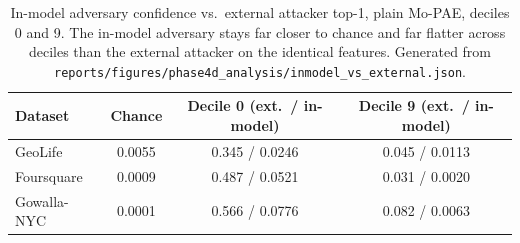 \begin{table}[t]
\centering
\caption{In-model adversary confidence vs.\ external attacker top-1, plain Mo-PAE, deciles 0 and 9. The in-model adversary stays far closer to chance and far flatter across deciles than the external attacker on the identical features. Generated from \texttt{reports/figures/phase4d\_analysis/inmodel\_vs\_external.json}.}
\label{tab:inmodel-vs-external}
\small
\begin{tabular}{@{}lccc@{}}
\toprule
Dataset & Chance & Decile 0 (ext.\ / in-model) & Decile 9 (ext.\ / in-model) \\
\midrule
GeoLife & 0.0055 & 0.345 / 0.0246 & 0.045 / 0.0113 \\
Foursquare & 0.0009 & 0.487 / 0.0521 & 0.031 / 0.0020 \\
Gowalla-NYC & 0.0001 & 0.566 / 0.0776 & 0.082 / 0.0063 \\
\bottomrule
\end{tabular}
\end{table}
